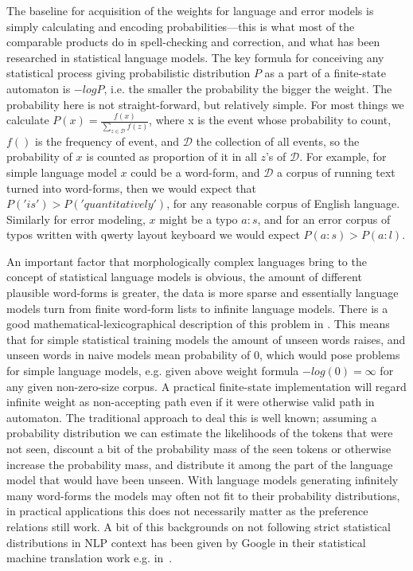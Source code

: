 \documentclass[officiallayout,draft]{unihelcompling}
\begin{document}
The baseline for acquisition of the weights for language and error models is
simply calculating and encoding probabilities---this is what most of the
comparable products do in spell-checking and correction, and what has been
researched in statistical language models. The key formula for conceiving any
statistical process giving probabilistic distribution $P$ as a part of a
finite-state automaton is $-log P$, i.e. the smaller the probability the bigger
the weight. The probability here is not straight-forward, but relatively
simple. For most things we calculate $P(x) = \frac{f(x)}{\sum_{z \in
\mathcal{D}} f(z)}$, where x is the event whose probability to count, $f()$ is
the frequency of event, and $\mathcal{D}$ the collection of all events, so the
probability of $x$ is counted as proportion of it in all $z$'s of
$\mathcal{D}$. For example, for simple language model $x$ could be a word-form,
and $\mathcal{D}$ a corpus of running text turned into word-forms, then we
would expect that $P('is') > P('quantitatively')$, for any reasonable corpus of
English language. Similarly for error modeling, $x$ might be a typo $a:s$, and
for an error corpus of typos written with qwerty layout keyboard we would
expect $P(a:s) > P(a:l)$.

An important factor that morphologically complex languages bring to the
concept of statistical language models is obvious, the amount of different
plausible word-forms is greater, the data is more sparse and essentially
language models turn from finite word-form lists to infinite language models.
There is a good mathematical-lexicographical description of this problem in
\citep{kornai2002many}. This means that for simple statistical training models
the amount of unseen words raises, and unseen words in naive models mean
probability of $0$, which would pose problems for simple language models, e.g.
given above weight formula $-log(0) = \infty$ for any given non-zero-size
corpus. A practical finite-state implementation will regard infinite weight
as non-accepting path even if it were otherwise valid path in automaton. The
traditional approach to deal this is well known;
assuming a probability distribution we can estimate the likelihoods of the
tokens that were not seen, discount a bit of the probability mass of the seen
tokens or otherwise increase the probability mass, and distribute it among the
part of the language model that would have been unseen. With language models
generating infinitely many word-forms the models may often not fit to their
probability distributions, in practical applications this does not necessarily
matter as the preference relations still work. A bit of this backgrounds on not
following strict statistical distributions in NLP context has been given by
Google in their statistical machine translation work e.g. 
in~\citet{brants2007large}.
\end{document}

